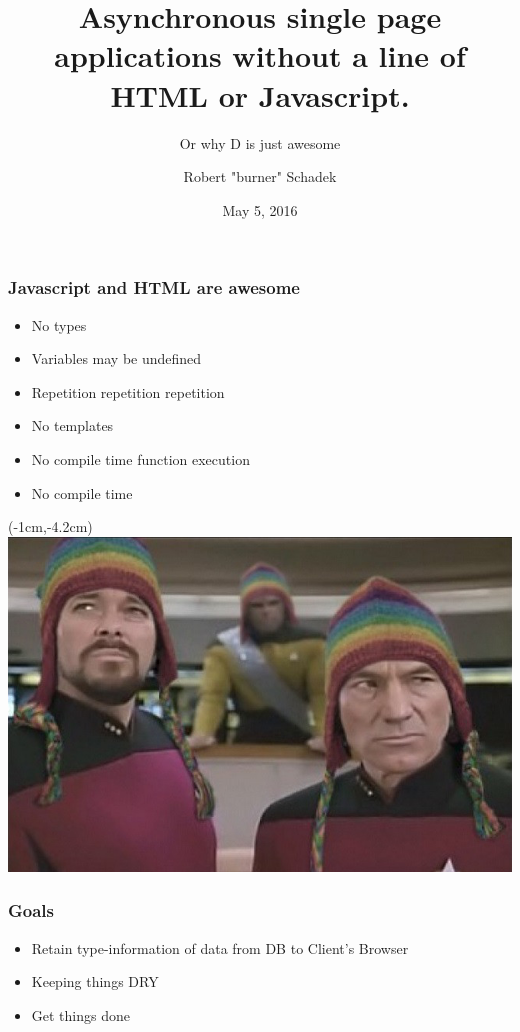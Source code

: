 \documentclass[notes,xelatex,13pt]{beamer}
\title{Asynchronous single page applications without a line of HTML or
Javascript.}
\subtitle{Or why D is just awesome}
\author{Robert "burner" Schadek}
\date{May 5, 2016}
\institute{DConf}
\begin{document}
\maketitle

\begin{frame}
	\frametitle{Javascript and HTML are \textbf{awesome}}
	\begin{itemize}
		\item No types
		\item Variables may be undefined
		\item Repetition repetition repetition
		\item No templates
		\item No compile time function execution
			\pause
		\item No compile time
	\end{itemize}
\end{frame}


\begin{frame}[plain]
\begin{textblock*}{0cm}(-1cm,-4.2cm)
	\includegraphics[width=1.0\paperwidth]{picardriker.jpg}
\end{textblock*}
\end{frame}

\begin{frame}
	\frametitle{Goals}	
	\begin{itemize}
		\item Retain type-information of data from DB to Client's Browser
			\pause
		\item Keeping things DRY	
			\pause
		\item Get things done
			\pause
	\end{itemize}
\end{frame}
\end{document}
